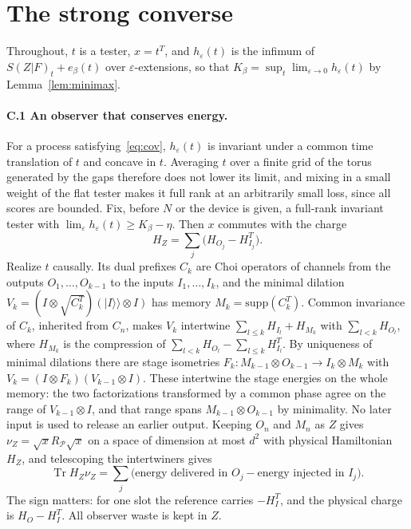 \documentclass[11pt]{article}
\theoremstyle{definition}
\theoremstyle{remark}
\newcommand{\Tr}{\operatorname{Tr}}
\newcommand{\Kb}{K_\beta}
\newcommand{\Pp}{\mathcal P}
\begin{document}
\section{The strong converse}\label{app:converse}

Throughout, $t$ is a tester, $x=t^T$, and $h_\varepsilon(t)$ is the infimum of $S(Z|F)_t+e_\beta(t)$ over $\varepsilon$-extensions, so that $\Kb=\sup_t\lim_{\varepsilon\to0}h_\varepsilon(t)$ by Lemma~\ref{lem:minimax}.

\paragraph{C.1 An observer that conserves energy.} For a process satisfying~\eqref{eq:cov}, $h_\varepsilon(t)$ is invariant under a common time translation of $t$ and concave in $t$. Averaging $t$ over a finite grid of the torus generated by the gaps therefore does not lower its limit, and mixing in a small weight of the flat tester makes it full rank at an arbitrarily small loss, since all scores are bounded. Fix, before $N$ or the device is given, a full-rank invariant tester with $\lim_\varepsilon h_\varepsilon(t)\ge\Kb-\eta$. Then $x$ commutes with the charge
\[
H_Z=\sum_j\bigl(H_{O_j}-H_{I_j}^T\bigr).
\]
Realize $t$ causally. Its dual prefixes $C_k$ are Choi operators of channels from the outputs $O_1,\dots,O_{k-1}$ to the inputs $I_1,\dots,I_k$, and the minimal dilation $V_k=(I\otimes\sqrt{C_k^T})(|I\rangle\!\rangle\otimes I)$ has memory $M_k=\mathrm{supp}(C_k^T)$. Common invariance of $C_k$, inherited from $C_n$, makes $V_k$ intertwine $\sum_{l\le k}H_{I_l}+H_{M_k}$ with $\sum_{l<k}H_{O_l}$, where $H_{M_k}$ is the compression of $\sum_{l<k}H_{O_l}-\sum_{l\le k}H_{I_l}^T$. By uniqueness of minimal dilations there are stage isometries $F_k:M_{k-1}\otimes O_{k-1}\to I_k\otimes M_k$ with $V_k=(I\otimes F_k)(V_{k-1}\otimes I)$. These intertwine the stage energies on the whole memory: the two factorizations transformed by a common phase agree on the range of $V_{k-1}\otimes I$, and that range spans $M_{k-1}\otimes O_{k-1}$ by minimality. No later input is used to release an earlier output. Keeping $O_n$ and $M_n$ as $Z$ gives $\nu_Z=\sqrt xR_\Pp\sqrt x$ on a space of dimension at most $d^2$ with physical Hamiltonian $H_Z$, and telescoping the intertwiners gives
\[
\Tr H_Z\nu_Z=\sum_j\bigl(\text{energy delivered in }O_j-\text{energy injected in }I_j\bigr).
\]
The sign matters: for one slot the reference carries $-H_I^T$, and the physical charge is $H_O-H_I^T$. All observer waste is kept in $Z$.
\end{document}
